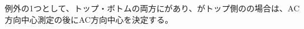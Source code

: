 \begin{hosoku}
例外の1つとして、トップ・ボトムの両方に\Outcut があり、\OutcutCenterReference がトップ側の\OutcutAsideThickness の場合は、\TopOutcut AC方向中心測定の後に\BottomOutcut AC方向中心を決定する。
\end{hosoku}

